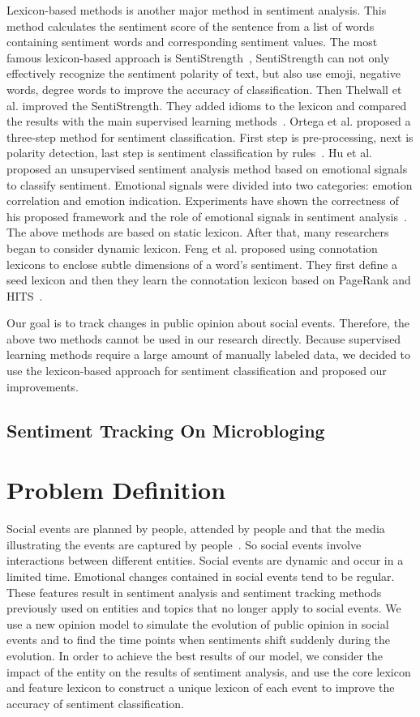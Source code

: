 \documentclass[runningheads]{llncs}
\begin{document}
Lexicon-based methods is another major method in sentiment analysis. This method calculates the sentiment score of the sentence from a list of words containing sentiment words and corresponding sentiment values. The most famous lexicon-based approach is SentiStrength~\cite{sentistrength2010}, SentiStrength can not only effectively recognize the sentiment polarity of text, but also use emoji, negative words, degree words to improve the accuracy of classification. Then Thelwall et al. improved the SentiStrength. They added idioms to the lexicon and compared the results with the main supervised learning methods~\cite{Thelwall2012lexicon}. Ortega et al. proposed a three-step method for sentiment classification. First step is pre-processing, next is polarity detection, last step is sentiment classification by rules~\cite{Ortega2013lexicon}. Hu et al. proposed an unsupervised sentiment analysis method based on emotional signals to classify sentiment. Emotional signals were divided into two categories: emotion correlation and emotion indication. Experiments have shown the correctness of his proposed framework and the role of emotional signals in sentiment analysis~\cite{Hu2013lexicon}. The above methods are based on static lexicon. After that, many researchers began to consider dynamic lexicon.  Feng et al. proposed using connotation lexicons to enclose subtle dimensions of a word’s sentiment. They first define a seed lexicon and then they learn the connotation lexicon based on PageRank and HITS~\cite{Feng2011lexicon}.

Our goal is to track changes in public opinion about social events. Therefore, the above two methods cannot be used in our research directly. Because supervised learning methods require a large amount of manually labeled data, we decided to use the lexicon-based approach for sentiment classification and proposed our improvements.
\subsection{Sentiment Tracking On Microbloging}

\section{Problem Definition}\label{sec:problem definition}
Social events are planned by people, attended by people and that the media illustrating the events are captured by people~\cite{Papadopoulos2012SocialEvent}. So social events involve interactions between different entities. Social events are dynamic and occur in a limited time. Emotional changes contained in social events tend to be regular. These features result in sentiment analysis and sentiment tracking methods previously used on entities and topics that no longer apply to social events. We use a new opinion model to simulate the evolution of public opinion in social events and to find the time points when sentiments shift suddenly during the evolution. In order to achieve the best results of our model, we consider the impact of the entity on the results of sentiment analysis, and use the core lexicon and feature lexicon to construct a unique lexicon of each event to improve the accuracy of sentiment classification.
\end{document}
